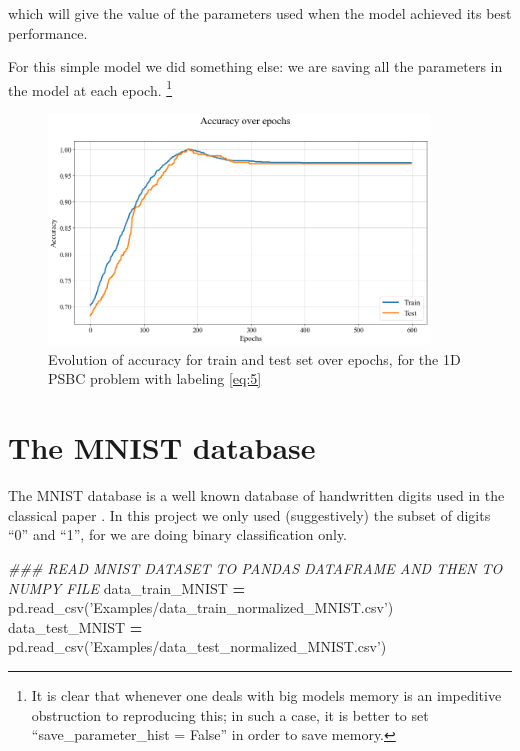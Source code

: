 \documentclass[openany,twoside]{book}
\newenvironment{Shaded}{\begin{snugshade}}{\end{snugshade}}
\newcommand{\CommentTok}[1]{\textcolor[rgb]{0.56,0.35,0.01}{\textit{#1}}}
\newcommand{\NormalTok}[1]{#1}
\newcommand{\OperatorTok}[1]{\textcolor[rgb]{0.81,0.36,0.00}{\textbf{#1}}}
\newcommand{\StringTok}[1]{\textcolor[rgb]{0.31,0.60,0.02}{#1}}
\begin{document}
which will give the value of the parameters used when the model achieved its best performance.

For this simple model we did something else: we are saving all the parameters in the model at each epoch. \footnote{It is clear that whenever one deals with big models memory is an impeditive obstruction to reproducing this; in such a case, it is better to set ``save\_parameter\_hist = False'' in order to save memory.}

\begin{figure}[htbp]
\centering
\includegraphics[width=0.9\textwidth,height=\textheight]{figures/output_55_0.png}
\caption{Evolution of accuracy for train and test set over epochs, for the 1D PSBC problem with labeling \ref{eq:5}}
\end{figure}

\hypertarget{sec:mnist}{%
\chapter{The MNIST database}\label{sec:mnist}}

The MNIST database is a well known database of handwritten digits used in the classical paper \citep{Mnist}. In this project we only used (suggestively) the subset of digits ``0'' and ``1'', for we are doing binary classification only.

\begin{Shaded}
\begin{Highlighting}[]
\CommentTok{### READ MNIST DATASET TO PANDAS DATAFRAME AND THEN TO NUMPY FILE}
\NormalTok{data_train_MNIST }\OperatorTok{=}\NormalTok{ pd.read_csv(}\StringTok{'Examples/data_train_normalized_MNIST.csv'}\NormalTok{)}
\NormalTok{data_test_MNIST }\OperatorTok{=}\NormalTok{ pd.read_csv(}\StringTok{'Examples/data_test_normalized_MNIST.csv'}\NormalTok{)}
\end{Highlighting}
\end{Shaded}
\end{document}
